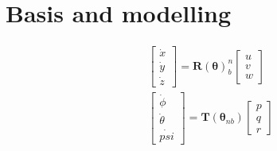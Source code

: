 \chapter{Basis and modelling}

\begin{subequations}
\begin{align}
& \begin{bmatrix}
\dot{x} \\
\dot{y} \\
\dot{z}
\end{bmatrix}
=
 \bm{R}(\bm{\theta})_b^n\begin{bmatrix}
 u \\
 v \\
 w
 \end{bmatrix} \\
& \begin{bmatrix}
\dot{\phi} \\
\dot{\theta} \\
\dot{psi}
\end{bmatrix}
= 
\bm{T}(\bm{\theta}_{nb})\begin{bmatrix}
p \\
q \\
r
\end{bmatrix}
\end{align}
\end{subequations}

